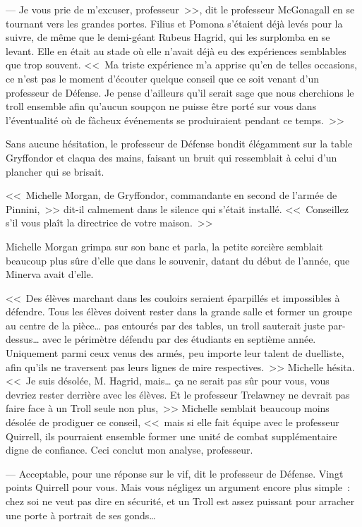 --- Je vous prie de m'excuser, professeur~>>, dit le professeur McGonagall en se tournant vers les grandes portes. Filius et Pomona s'étaient déjà levés pour la suivre, de même que le demi-géant Rubeus Hagrid, qui les surplomba en se levant. Elle en était au stade où elle n'avait déjà eu des expériences semblables que trop souvent. <<~Ma triste expérience m'a apprise qu'en de telles occasions, ce n'est pas le moment d'écouter quelque conseil que ce soit venant d'un professeur de Défense. Je pense d'ailleurs qu'il serait sage que nous cherchions le troll ensemble afin qu'aucun soupçon ne puisse être porté sur vous dans l'éventualité où de fâcheux événements se produiraient pendant ce temps.~>>

Sans aucune hésitation, le professeur de Défense bondit élégamment sur la table Gryffondor et claqua des mains, faisant un bruit qui ressemblait à celui d'un plancher qui se brisait.

<<~Michelle Morgan, de Gryffondor, commandante en second de l'armée de Pinnini,~>> dit-il calmement dans le silence qui s'était installé. <<~Conseillez s'il vous plaît la directrice de votre maison.~>>

Michelle Morgan grimpa sur son banc et parla, la petite sorcière semblait beaucoup plus sûre d'elle que dans le souvenir, datant du début de l'année, que Minerva avait d'elle.

<<~Des élèves marchant dans les couloirs seraient éparpillés et impossibles à défendre. Tous les élèves doivent rester dans la grande salle et former un groupe au centre de la pièce… pas entourés par des tables, un troll sauterait juste par-dessus… avec le périmètre défendu par des étudiants en septième année. Uniquement parmi ceux venus des armés, peu importe leur talent de duelliste, afin qu'ils ne traversent pas leurs lignes de mire respectives.~>> Michelle hésita. <<~Je suis désolée, M. Hagrid, mais… ça ne serait pas sûr pour vous, vous devriez rester derrière avec les élèves. Et le professeur Trelawney ne devrait pas faire face à un Troll seule non plus,~>> Michelle semblait beaucoup moins désolée de prodiguer ce conseil, <<~mais si elle fait équipe avec le professeur Quirrell, ils pourraient ensemble former une unité de combat supplémentaire digne de confiance. Ceci conclut mon analyse, professeur.

--- Acceptable, pour une réponse sur le vif, dit le professeur de Défense. Vingt points Quirrell pour vous. Mais vous négligez un argument encore plus simple~: chez soi ne veut pas dire en sécurité, et un Troll est assez puissant pour arracher une porte à portrait de ses gonds…

